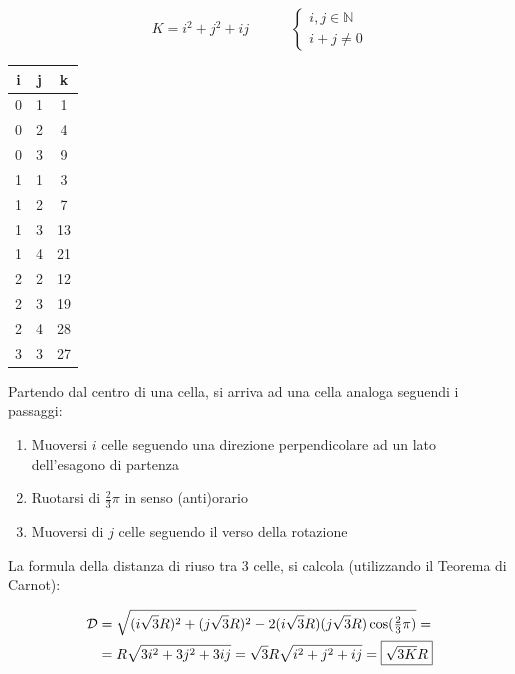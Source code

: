 \documentclass{article}
\begin{document}
\begin{minipage}{0.5\textwidth}
\[ K = i^2 + j^2 + ij \qquad\quad
    \begin{cases}
    i,j \in \mathbb{N} \\
    i+j \neq 0
    \end{cases}
\]
\end{minipage}
\begin{minipage}{0.3\textwidth}

\begin{center}
\begin{tabular}{c c|c}
    i & j & k\\
    \hline{}
    0 & 1 & 1\\
    0 & 2 & 4\\
    0 & 3 & 9\\
    1 & 1 & 3\\
    1 & 2 & 7\\
    1 & 3 & 13\\
    1 & 4 & 21\\
    2 & 2 & 12\\
    2 & 3 & 19\\
    2 & 4 & 28\\
    3 & 3 & 27\\
\end{tabular}
\end{center}
\end{minipage}

Partendo dal centro di una cella, si arriva ad una cella analoga seguendi i passaggi:
\begin{enumerate}
    \item Muoversi $i$ celle seguendo una direzione perpendicolare ad un lato dell'esagono di partenza
    \item Ruotarsi di $\frac{2}{3}\pi$ in senso (anti)orario
    \item Muoversi di $j$ celle seguendo il verso della rotazione
\end{enumerate}

La formula della distanza di riuso tra 3 celle, si calcola (utilizzando il Teorema di Carnot):

\[
\begin{aligned}
    \mathcal{D} &= \sqrt{(i\sqrt{3}R)^2 + (j\sqrt{3}R)^2 - 2(i\sqrt{3}R)(j\sqrt{3}R)\cos({\textstyle \frac{2}{3}}\pi) } = \\
                &= R\sqrt{3i^2 + 3j^2 + 3ij} = \sqrt{3}R\sqrt{i^2 + j^2 + ij} = \framebox{$\sqrt{3K}R$}
\end{aligned}
\]
\end{document}

